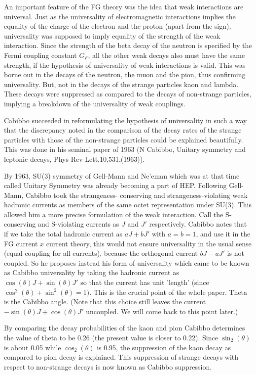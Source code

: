 An important feature of the FG theory was the idea that weak
interactions are universal. Just as the universality of 
electromagnetic interactions implies the equality of the 
charge of the electron and the proton (apart from the sign),
universality was supposed to imply equality of the strength
of the weak interaction. Since the strength of the beta decay
of the neutron is specified by the Fermi coupling constant $G_{F}$,
all the other weak decays also must have the same strength,
if the hypothesis of universality of weak interactions is valid.
This was borne out in the decays of the neutron, the muon and
the pion, thus confirming universality. But, not in the decays
of the strange particles kaon and lambda. These decays were 
suppressed as compared to the decays of non-strange particles,
implying a breakdown of the universality of weak couplings.

Cabibbo succeeded in reformulating the hypothesis of universality 
in such a way that the discrepancy noted in the comparison of
the decay rates of the strange particles with those of the
non-strange particles could be explained beautifully. This
was done in his seminal paper of 1963 (N Cabibbo, Unitary symmetry
and leptonic decays, Phys Rev Lett,10,531,(1963)).

By 1963, SU(3) symmetry of Gell-Mann and Ne'eman which was
at that time called Unitary Symmetry was already becoming a part
of HEP. Following Gell-Mann, Cabibbo took the strangeness-
conserving and strangeness-violating weak hadronic
currents as members of the same octet representation under 
SU(3). This allowed him a more precise formulation of the
weak interaction. Call the S-conserving and S-violating
currents as $J$ and $J'$ respectively. Cabibbo notes that
if we take the total hadronic current as $aJ + bJ'$ with $a=b=1$,
and use it in the FG current $x$ current theory, this would
not ensure universality in the usual sense (equal coupling
for all currents), because the orthogonal current $bJ-aJ'$ is not
coupled. So he proposes instead his form of universality
which came to be known as Cabibbo universality by taking
the hadronic current as $\cos(\theta)J + \sin(\theta)J'$ so that
the current has unit 'length' (since $\cos^{2}(\theta)+\sin^{2}(\theta)
=1)$. This is the crucial point of the whole paper. Theta is
the Cabibbo angle. (Note that this choice still leaves the
current $-\sin(\theta)J + \cos(\theta) J'$ uncoupled. We will come 
back to this point later.)

By comparing the decay probabilities of the kaon and pion
Cabibbo determines the value of theta to be 0.26 (the present
value is closer to 0.22). Since $\sin_{2}(\theta)$ is about 0.05
while $\cos_{2}(\theta)$ is 0.95, the suppression of the kaon
decay as compared to pion decay is explained. This suppression
of strange decays with respect to non-strange decays is now
known as Cabibbo suppression.

